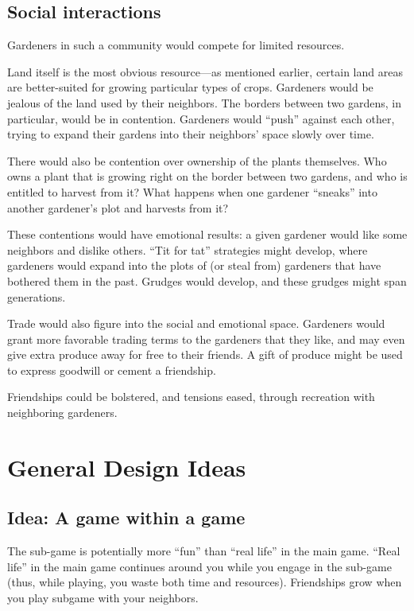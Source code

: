 \documentclass[12pt]{article}
\begin{document}
\subsection{Social interactions}

Gardeners in such a community would compete for limited resources.

Land itself is the most obvious resource---as mentioned earlier, certain land areas are better-suited for growing particular types of crops.
Gardeners would be jealous of the land used by their neighbors.
The borders between two gardens, in particular, would be in contention.
Gardeners would ``push'' against each other, trying to expand their gardens into their neighbors' space slowly over time. 

There would also be contention over ownership of the plants themselves.
Who owns a plant that is growing right on the border between two gardens, and who is entitled to harvest from it?
What happens when one gardener ``sneaks'' into another gardener's plot and harvests from it?

These contentions would have emotional results:  a given gardener would like some neighbors and dislike others.
``Tit for tat'' strategies might develop, where gardeners would expand into the plots of (or steal from) gardeners that have bothered them in the past.
Grudges would develop, and these grudges might span generations.

Trade would also figure into the social and emotional space.
Gardeners would grant more favorable trading terms to the gardeners that they like, and may even give extra produce away for free to their friends.
A gift of produce might be used to express goodwill or cement a friendship.

Friendships could be bolstered, and tensions eased, through recreation with neighboring gardeners.



\section{General Design Ideas}

\subsection{Idea: A game within a game}
The sub-game is potentially more ``fun'' than ``real life'' in the main game.
``Real life'' in the main game continues around you while you engage in the sub-game (thus, while playing, you waste both time and resources).
Friendships grow when you play subgame with your neighbors.
\end{document}
